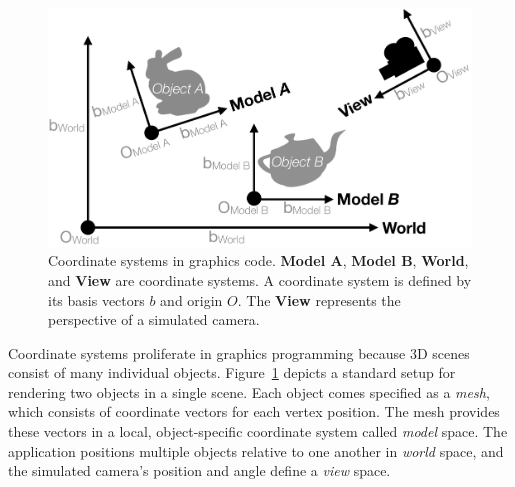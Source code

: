 \documentclass[../main.tex]{subfiles}
\begin{document}
	\begin{figure}
		\centering
		\includegraphics[width=\linewidth]{fig/coordinate-spaces-2.pdf}
		\caption{Coordinate systems in graphics code.
			\textbf{Model A}, \textbf{Model B}, \textbf{World}, and \textbf{View} are coordinate systems.
			A coordinate system is defined by its basis vectors $b$ and origin $O$.
			The \textbf{View} represents the perspective of a simulated camera.
		}
		\label{fig:spaces}
	\end{figure}
	
	Coordinate systems proliferate in graphics programming because 3D scenes consist of many individual objects.
	Figure~\ref{fig:spaces} depicts a standard setup for rendering two objects in a single scene.
	Each object comes specified as a \emph{mesh}, which consists of coordinate vectors for each vertex position.
	The mesh provides these vectors in a local, object-specific coordinate system called \emph{model} space.
	The application positions multiple objects relative to one another in \emph{world} space,
	and the simulated camera's position and angle define a \emph{view} space.
	
\end{document}
